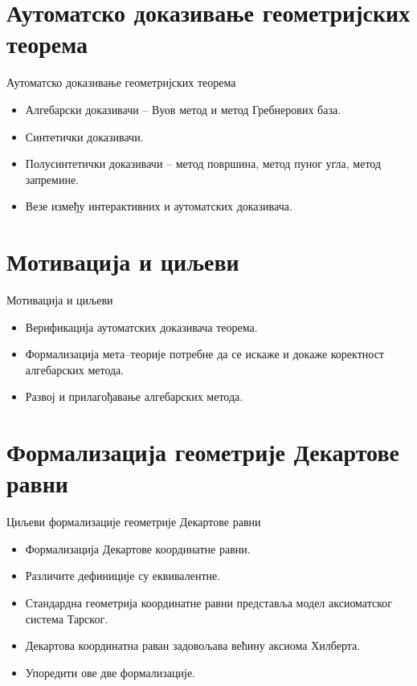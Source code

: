 \documentclass[slidestop, compress, mathserif, containsverbatim, xcolor=dvipsnames]{beamer}
\begin{document}
\section{Аутоматско доказивање геометријских теорема}

\begin{frame}{Аутоматско доказивање геометријских теорема}
  \begin{itemize}
  \item Алгебарски доказивачи -- Вуов метод и метод Гребнерових база. \vfill
  \item Синтетички доказивачи. \vfill
   \item Полусинтетички доказивачи --  метод површина, метод пуног угла, метод запремине.\vfill
  \item Везе између интерактивних и аутоматских доказивача. \vfill
  \end{itemize}
\end{frame}

\section{Мотивација и циљеви}

\begin{frame}{Мотивација и циљеви}
  \begin{itemize}
  \item Верификација аутоматских доказивача теорема. \vfill
  \item Формализација мета--теорије потребне да се искаже и докаже
    коректност алгебарских метода. \vfill
  \item Развој и прилагођавање алгебарских метода.
  \end{itemize}
\end{frame}

\section{Формализација геометрије Декартове равни}

\begin{frame}{Циљеви формализације геометрије Декартове равни}
  \begin{itemize}
  \item Формализација Декартове координатне равни. \vfill
  \item Различите дефиниције су еквивалентне. \vfill
  \item Стандардна геометрија координатне равни представља модел
    аксиоматског система Тарског. \vfill
  \item Декартова координатна раван задовољава већину аксиома Хилберта. \vfill
  \item Упоредити ове две формализације. \vfill
  \end{itemize}
\end{frame}
\end{document}
